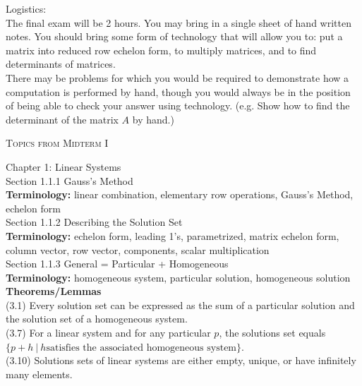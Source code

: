 \documentclass[11pt,fleqn]{article}
\begin{document}
\renewcommand{\headrulewidth}{0pt}
\newcommand{\blank}[1]{\rule{#1}{0.75pt}}
\renewcommand{\d}{\displaystyle}

\vspace*{-0.7in}

\begin{center}
  \large {}
\end{center}

\noindent Logistics:\\
The final exam will be 2  hours. You may bring in a single sheet of hand written notes. You should bring some form of technology that will allow you to: put a matrix into reduced row echelon form, to multiply matrices, and to find determinants of matrices.\\

There may be problems for which you would be required to demonstrate how a computation is performed by hand, though you would always be in the position of being able to check your answer using technology. (e.g. Show how to find the determinant of the matrix $A$ by hand.)


\begin{center} \textsc{Topics from Midterm I} \end{center}

\noindent Chapter 1: Linear Systems\\

\noindent Section 1.1.1 Gauss's Method\\

\textbf{Terminology:}  linear combination, elementary row operations, Gauss's Method, echelon form\\

\noindent Section 1.1.2 Describing the Solution Set\\

\textbf{Terminology:} echelon form, leading 1's, parametrized, matrix echelon form, column vector, row vector, components, scalar multiplication\\

\noindent Section 1.1.3 General = Particular + Homogeneous\\

\textbf{Terminology:} homogeneous system, particular solution, homogeneous solution\\

\textbf{Theorems/Lemmas} \\
(3.1) Every solution set can be expressed as the sum of a particular solution and the solution set of a homogeneous system.\\
(3.7) For a linear system and for any particular $p$, the solutions set equals $\{p+h \: | \: h  \text{satisfies the associated homogeneous system}\}$.\\
(3.10) Solutions sets of linear systems are either empty, unique, or have infinitely many elements.\\
\end{document}
